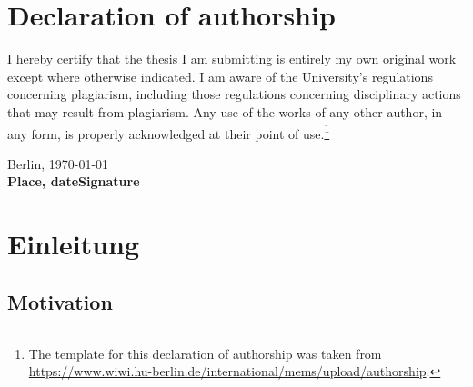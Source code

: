 \documentclass[12pt,twoside]{book}
\newcommand\blankpage{%
    \null
    \thispagestyle{empty}%
    \addtocounter{page}{-1}%
    \newpage}
\begin{document}


\chapter*{Declaration of authorship}

I hereby certify that the thesis I am submitting is entirely my own original work except where otherwise indicated. I am aware of the University's regulations concerning plagiarism, including those regulations concerning disciplinary actions that may result from plagiarism. Any use of the works of any other author, in any form, is properly acknowledged at their point of use.\footnote{The template for this declaration of authorship was taken from \url{https://www.wiwi.hu-berlin.de/international/mems/upload/authorship}.}

\vspace{2cm}

Berlin, \today\\
\textbf{Place, date}\hfill\textbf{Signature}

\tableofcontents
\newpage


\chapter{Einleitung}

\section*{Motivation}
\end{document}
